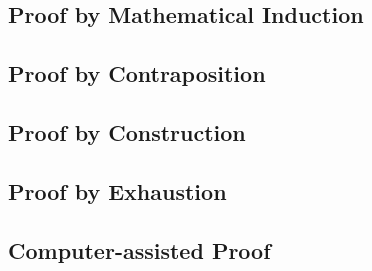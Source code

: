 \documentclass{report}
\begin{document}
	\subsection{Proof by Mathematical Induction}
	
	\subsection{Proof by Contraposition}
	
	\subsection{Proof by Construction}
	
	\subsection{Proof by Exhaustion}
	
	\subsection{Computer-assisted Proof}
	
\end{document}
